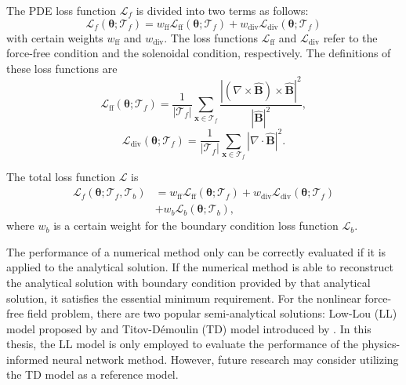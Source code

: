 The PDE loss function $\mathcal{L}_f$ is divided into two terms as follows:
\begin{equation*}
    \mathcal{L}_f(\boldsymbol{\theta}; \mathcal{T}_f) = w_{\text{ff}}\mathcal{L}_\text{ff}(\boldsymbol{\theta}; \mathcal{T}_f) + w_{\text{div}}\mathcal{L}_\text{div}(\boldsymbol{\theta}; \mathcal{T}_f)
\end{equation*}
with certain weights $w_{\text{ff}}$ and $w_{\text{div}}$. The loss functions $\mathcal{L}_\text{ff}$ and $\mathcal{L}_\text{div}$ refer to the force-free condition and the solenoidal condition, respectively. The definitions of these loss functions are
\begin{equation*}
    \mathcal{L}_\text{ff}(\boldsymbol{\theta}; \mathcal{T}_f) = \frac{1}{|\mathcal{T}_f|} \sum_{\boldsymbol{x}\in \mathcal{T}_f} \frac{|(\nabla \times \mathbf{\hat{B}})\times \mathbf{\hat{B}}|^2}{|\mathbf{\hat{B}}|^2},
\end{equation*}
\begin{equation*}
    \mathcal{L}_\text{div}(\boldsymbol{\theta}; \mathcal{T}_f) = \frac{1}{|\mathcal{T}_f|} \sum_{\boldsymbol{x}\in \mathcal{T}_f} |\nabla \cdot \mathbf{\hat{B}}|^2.
\end{equation*}

The total loss function $\mathcal{L}$ is
\begin{align*}
    \mathcal{L}_f(\boldsymbol{\theta}; \mathcal{T}_f, \mathcal{T}_b) & = w_{\text{ff}}\mathcal{L}_\text{ff}(\boldsymbol{\theta}; \mathcal{T}_f) + w_{\text{div}}\mathcal{L}_\text{div}(\boldsymbol{\theta}; \mathcal{T}_f) \\ & + w_b\mathcal{L}_b(\boldsymbol{\theta}; \mathcal{T}_b),
\end{align*}
where $w_b$ is a certain weight for the boundary condition loss function $\mathcal{L}_b$.

The performance of a numerical method only can be correctly evaluated if it is applied to the analytical solution. If the numerical method is able to reconstruct the analytical solution with boundary condition provided by that analytical solution, it satisfies the essential minimum requirement. For the nonlinear force-free field problem, there are two popular semi-analytical solutions: Low-Lou (LL) model proposed by \parencite{low1990modeling} and Titov-D\'emoulin (TD) model introduced by \parencite{titov1999basic}. In this thesis, the LL model is only employed to evaluate the performance of the physics-informed neural network method. However, future research may consider utilizing the TD model as a reference model.


